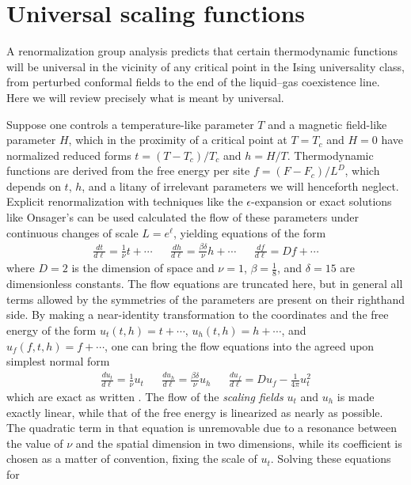 \documentclass[
  aps,
  pre,
  preprint,
  longbibliography,
  floatfix
]{revtex4-2}
\begin{document}
\section{Universal scaling functions}

A renormalization group analysis predicts that certain thermodynamic functions
will be universal in the vicinity of any critical point in the Ising
universality class, from perturbed conformal fields to the end of the
liquid--gas coexistence line. Here we will review precisely what is meant by
universal.

Suppose one controls a temperature-like parameter $T$ and a magnetic field-like
parameter $H$, which in the proximity of a critical point at $T=T_c$ and $H=0$
have normalized reduced forms $t=(T-T_c)/T_c$ and $h=H/T$. Thermodynamic
functions are derived from the free energy per site $f=(F-F_c)/L^D$, which
depends on $t$, $h$, and a litany of irrelevant parameters we will henceforth
neglect.  Explicit renormalization with techniques like the
$\epsilon$-expansion or exact solutions like Onsager's can be used calculated
the flow of these parameters under continuous changes of scale $L=e^\ell$,
yielding equations of the form
\begin{align} \label{eq:raw.flow}
  \frac{dt}{d\ell}=\frac1\nu t+\cdots
  &&
  \frac{dh}{d\ell}=\frac{\beta\delta}\nu h+\cdots
  &&
  \frac{df}{d\ell}=Df+\cdots
\end{align}
where $D=2$ is the dimension of space and $\nu=1$, $\beta=\frac18$, and
$\delta=15$ are dimensionless constants. The flow equations are truncated here,
but in general all terms allowed by the symmetries of the parameters are
present on their righthand side. By making a near-identity transformation to
the coordinates and the free energy of the form $u_t(t, h)=t+\cdots$, $u_h(t,
h)=h+\cdots$, and $u_f(f,t,h)=f+\cdots$, one can bring the flow equations into
the agreed upon simplest normal form
\begin{align} \label{eq:flow}
  \frac{du_t}{d\ell}=\frac1\nu u_t
  &&
  \frac{du_h}{d\ell}=\frac{\beta\delta}\nu u_h
  &&
  \frac{du_f}{d\ell}=Du_f-\frac1{4\pi}u_t^2
\end{align}
which are exact as written \cite{Raju_2019_Normal}. The flow of the
\emph{scaling fields} $u_t$ and $u_h$ is made exactly linear, while that of the
free energy is linearized as nearly as possible. The quadratic term in that
equation is unremovable due to a resonance between the value of $\nu$ and the
spatial dimension in two dimensions, while its coefficient is chosen as a
matter of convention, fixing the scale of $u_t$. Solving these equations for
\end{document}
